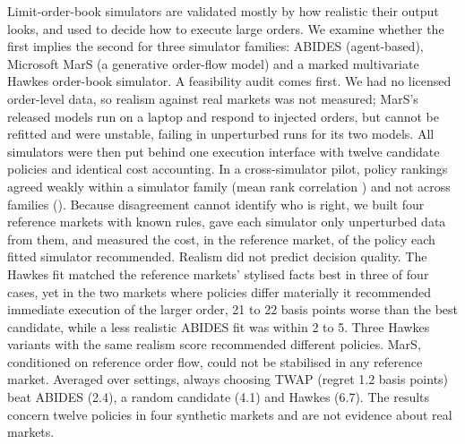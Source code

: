 Limit-order-book simulators are validated mostly by how realistic their output looks, and used to decide how to execute large orders. We examine whether the first implies the second for three simulator families: ABIDES (agent-based), Microsoft MarS (a generative order-flow model) and a marked multivariate Hawkes order-book simulator. A feasibility audit comes first. We had no licensed order-level data, so realism against real markets was not measured; MarS's released models run on a laptop and respond to injected orders, but cannot be refitted and were unstable, failing in \marsVolFail{} unperturbed runs for its two models. All simulators were then put behind one execution interface with twelve candidate policies and identical cost accounting. In a cross-simulator pilot, policy rankings agreed weakly within a simulator family (mean rank correlation \rankSame{}) and not across families (\rankCross{}). Because disagreement cannot identify who is right, we built four reference markets with known rules, gave each simulator only unperturbed data from them, and measured the cost, in the reference market, of the policy each fitted simulator recommended. Realism did not predict decision quality. The Hawkes fit matched the reference markets' stylised facts best in three of four cases, yet in the two markets where policies differ materially it recommended immediate execution of the larger order, 21 to 22 basis points worse than the best candidate, while a less realistic ABIDES fit was within 2 to 5. Three Hawkes variants with the same realism score recommended different policies. MarS, conditioned on reference order flow, could not be stabilised in any reference market. Averaged over settings, always choosing TWAP (regret 1.2 basis points) beat ABIDES (2.4), a random candidate (4.1) and Hawkes (6.7). The results concern twelve policies in four synthetic markets and are not evidence about real markets.
